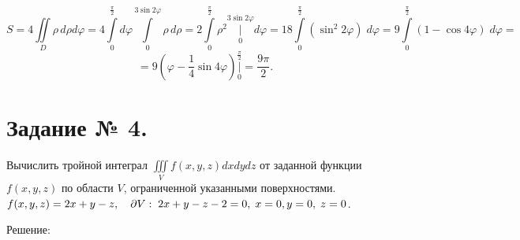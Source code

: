 \documentclass{article}
\begin{document}
$$S=4\iint\limits_{D}\rho \, d\rho d\varphi=4\int\limits_{0}^{\frac{\pi}{2}}d\varphi\int\limits_{0}^{3\sin{2\varphi}}\rho \, d\rho=2\int\limits_{0}^{\frac{\pi}{2}}\rho^2\bigg|\limits_{0}^{3\sin{2\varphi}}d\varphi=18\int\limits_{0}^{\frac{\pi}{2}}(\sin^2{2\varphi}) \; d\varphi=9\int\limits_{0}^{\frac{\pi}{2}}(1-\cos{4\varphi}) \; d\varphi=$$
$$=9\left(\varphi-\frac{1}{4}\sin4\varphi\right)\bigg|\limits_{0}^{\frac{\pi}{2}}=\frac{9\pi}{2}.$$


\section*{Задание № 4.}
 Вычислить тройной интеграл $\iiint\limits_{V} f(x,y,z)dx dy dz$ от заданной функции $f(x,y,z)$ по области $V$, ограниченной указанными поверхностями.
 $f(x,y,z)=2x+y-z,\quad \partial V:\; 2x+y-z-2=0,\;x=0,\;\\y=0,\;z=0$.
 \begin{center}Решение:\end{center}
\end{document}
